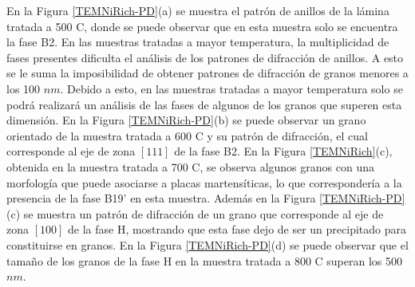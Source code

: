 \documentclass[12pt]{article}
\theoremstyle{definition}
\theoremstyle{remark}
\begin{document}
{En la Figura \ref{TEMNiRich-PD}(a) se muestra el patrón de anillos de la lámina tratada a 500 \textdegree C, donde se puede observar que en esta muestra solo se encuentra la fase B2. En las muestras tratadas a mayor temperatura, la multiplicidad de fases presentes dificulta el análisis de los patrones de difracción de anillos. A esto se le suma la imposibilidad de obtener patrones de difracción de granos menores a los 100 $nm$. Debido a esto, en las muestras tratadas a mayor temperatura solo se podrá realizará un análisis de las fases de algunos de los granos que superen esta dimensión. En la Figura \ref{TEMNiRich-PD}(b) se puede observar un grano orientado de la muestra tratada a 600 \textdegree C y su patrón de difracción, el cual corresponde al eje de zona $[111]$ de la fase B2. En la Figura \ref{TEMNiRich}(c), obtenida en la muestra tratada a 700 \textdegree C, se observa algunos granos con una morfología que puede asociarse a placas martensíticas, lo que correspondería a la presencia de la fase B19' en esta muestra. Además en la Figura \ref{TEMNiRich-PD}(c) se muestra un patrón de difracción de un grano que corresponde al eje de zona $[100]$  de la fase H, mostrando que esta fase dejo de ser un precipitado para constituirse en granos. En la Figura \ref{TEMNiRich-PD}(d) se puede observar que el tamaño de los granos de la fase H en la muestra tratada a 800 \textdegree C superan los 500 $nm$.

}
\end{document}
